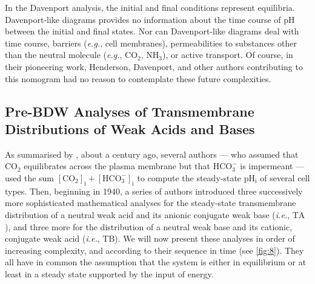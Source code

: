 \documentclass[fleqn,10pt]{physiome}
\begin{document}
In the Davenport analysis, the initial and final conditions represent equilibria. Davenport-like diagrams provides no information about the time course of $\mathrm{pH}$ between the initial and final states. Nor can Davenport-like diagrams deal with time course, barriers (\emph{e.g.}, cell membranes), permeabilities to substances other than the neutral molecule (\emph{e.g.}, $\mathrm{CO_2}$, $\mathrm{NH_3}$), or active transport. Of course, in their pioneering work, Henderson, Davenport, and other authors contributing to this nomogram had no reason to contemplate these future complexities.

\subsection{Pre-BDW Analyses of Transmembrane Distributions of Weak Acids and Bases}

As summarised by \cite{roos1981intracellular}, about a century ago, several authors --- who assumed that $\mathrm{CO_2}$ equilibrates across the plasma membrane but that $\mathrm{HCO_3^-}$ is impermeant --- used the sum $\mathrm{[CO_2]_i}+\mathrm{[HCO_3^-]_i}$ to compute the steady-state $\mathrm{pH_i}$ of several cell types. Then, beginning in 1940, a series of authors introduced three successively more sophisticated mathematical analyses for the steady-state transmembrane distribution of a neutral weak acid and its anionic conjugate weak base (\emph{i.e.}, $\mathrm{TA}$), and three more for the distribution of a neutral weak base and its cationic, conjugate weak acid (\emph{i.e.}, $\mathrm{TB}$). We will now present these analyses in order of increasing complexity, and according to their sequence in time (see \autoref{fig:8}). They all have in common the assumption that the system is either in equilibrium or at least in a steady state supported by the input of energy.
\end{document}
